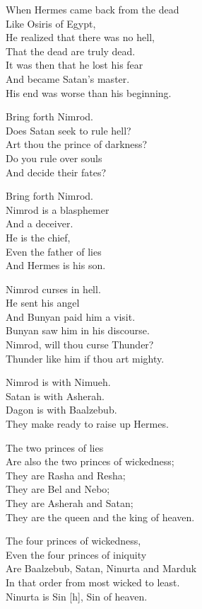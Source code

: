 \documentclass[
]{book}
\begin{document}
When Hermes came back from the dead\\
Like Osiris of Egypt,\\
He realized that there was no hell,\\
That the dead are truly dead.\\
It was then that he lost his fear\\
And became Satan's master.\\
His end was worse than his beginning.

Bring forth Nimrod.\\
Does Satan seek to rule hell?\\
Art thou the prince of darkness?\\
Do you rule over souls\\
And decide their fates?

Bring forth Nimrod.\\
Nimrod is a blasphemer\\
And a deceiver.\\
He is the chief,\\
Even the father of lies\\
And Hermes is his son.

Nimrod curses in hell.\\
He sent his angel\\
And Bunyan paid him a visit.\\
Bunyan saw him in his discourse.\\
Nimrod, will thou curse Thunder?\\
Thunder like him if thou art mighty.

Nimrod is with Nimueh.\\
Satan is with Asherah.\\
Dagon is with Baalzebub.\\
They make ready to raise up Hermes.

The two princes of lies\\
Are also the two princes of wickedness;\\
They are Rasha and Resha;\\
They are Bel and Nebo;\\
They are Asherah and Satan;\\
They are the queen and the king of heaven.

The four princes of wickedness,\\
Even the four princes of iniquity\\
Are Baalzebub, Satan, Ninurta and Marduk\\
In that order from most wicked to least.\\
Ninurta is Sin {[}h{]}, Sin of heaven.
\end{document}
